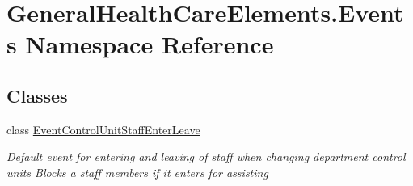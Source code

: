 \hypertarget{namespace_general_health_care_elements_1_1_events}{}\section{General\+Health\+Care\+Elements.\+Events Namespace Reference}
\label{namespace_general_health_care_elements_1_1_events}
\subsection*{Classes}
\begin{DoxyCompactItemize}
\item 
class \hyperlink{class_general_health_care_elements_1_1_events_1_1_event_control_unit_staff_enter_leave}{Event\+Control\+Unit\+Staff\+Enter\+Leave}
\begin{DoxyCompactList}\small\item\em Default event for entering and leaving of staff when changing department control units Blocks a staff members if it enters for assisting \end{DoxyCompactList}\end{DoxyCompactItemize}
